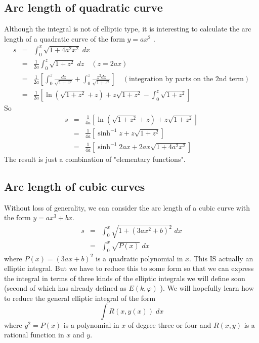 \documentclass{article}
\begin{document}
\subsection{Arc length of quadratic curve}
\label{sec-2-3}
Although the integral is not of elliptic type, it is interesting to calculate the arc length of a quadratic curve of the form $y=a x^{2}$ .
\begin{eqnarray}
s &=&  \int_{0}^{x} \sqrt{ 1  + 4 a^{2} x^{2} } \; dx \\ \nonumber
  &=& \frac{1}{2a} \int_{0}^{z} \sqrt{ 1  +   z^{2}} \; dz \quad (z = 2ax) \\ \nonumber
  &=& \frac{1}{2a} \left[ \int_{0}^{z} \frac{dz}{\sqrt{1 + z^{2}}} + \int_{0}^{z} \frac{z^{2}dz}{\sqrt{1 + z^{2}}} \right]  \quad (\text{integration by parts on the 2nd term}) \\ \nonumber
  &=& \frac{1}{2a} \left[ \ln{\left( \sqrt{1 + z^{2}} + z \right)} + z\sqrt{1 + z^{2}} - \int_{0}^{z} \sqrt{1 + z^{2}} \right]
\end{eqnarray}
So
\begin{eqnarray}
s &=& \frac{1}{4a} \left[ \ln{\left( \sqrt{1 + z^{2}} + z \right)} + z\sqrt{1 + z^{2}} \right] \\ \nonumber
  &=& \frac{1}{4a} \left[ \sinh^{-1}{z} + z\sqrt{1 + z^{2}} \right] \\ \nonumber
  &=& \frac{1}{4a} \left[ \sinh^{-1}{2ax} + 2ax\sqrt{1 + 4a^{2}x^{2}} \right] 
\end{eqnarray}
The result is just a combination of "elementary functions".
\subsection{Arc length of cubic curves}
\label{sec-2-4}
Without loss of generality, we can consider the arc length of a cubic curve with the form $y = ax^{3} + bx$.
\begin{eqnarray}
s &=&  \int_{0}^{x} \sqrt{ 1  + ( 3a x^{2} + b)^{2}} \; dx \\ \nonumber
  &=& \int_{0}^{x} \sqrt{P(x)} \; dx
\end{eqnarray}
where $P(x) = (3ax +b)^{2}$ is a quadratic polynomial in $x$. This IS actually an elliptic integral. 
But we have to reduce this to some form so that we can express the integral in terms of three kinds of the elliptic integrals we will define soon (second of which has already defined as $E(k,\varphi)$ ).
We will hopefully learn how to reduce the general elliptic integral of the form
\begin{equation}
\int R(x, y(x)) \; dx
\end{equation}
where $y^{2} = P(x)$ is a polynomial in $x$ of degree three or four and $R(x,y)$ is a rational function in $x$ and $y$.
\end{document}
